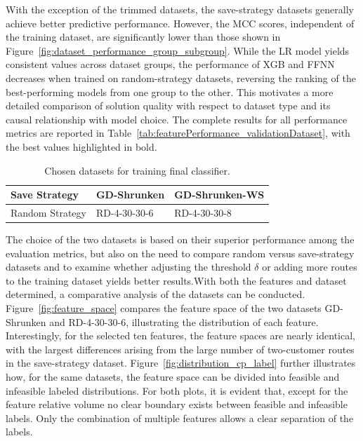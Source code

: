 With the exception of the trimmed datasets, the save-strategy datasets generally achieve better predictive performance.
However, the MCC scores, independent of the training dataset, are significantly lower than those shown in
Figure~\ref{fig:dataset_performance_group_subgroup}. While the LR model yields consistent values across dataset groups,
the performance of XGB and FFNN decreases when trained on random-strategy datasets, reversing the ranking of the best-performing
models from one group to the other. This motivates a more detailed comparison of solution quality with respect to dataset type and
its causal relationship with model choice. The complete results for all performance metrics are reported in Table~\ref{tab:featurePerformance_validationDataset},
with the best values highlighted in bold.
\begin{table}[ht]
    \centering
    \setlength{\tabcolsep}{0.75em}
    \def\arraystretch{1.25}
    \begin{tabular}{l|ll}
        Save Strategy   & GD-Shrunken  & GD-Shrunken-WS \\\hline
        Random Strategy & RD-4-30-30-6 & RD-4-30-30-8   \\
    \end{tabular}
    \caption{Chosen datasets for training final classifier.}
    \label{tab:chosen_datasets}
\end{table}
The choice of the two datasets is based on their superior performance among the evaluation metrics,
but also on the need to compare random versus save-strategy datasets and to examine whether adjusting the threshold $\delta$ or adding
more routes to the training dataset yields better results.With both the features and dataset determined, a comparative analysis of the
datasets can be conducted. Figure~\ref{fig:feature_space} compares the feature space of the two datasets GD-Shrunken and RD-4-30-30-6,
illustrating the distribution of each feature. Interestingly, for the selected ten features, the feature spaces are nearly identical,
with the largest differences arising from the large number of two-customer routes in the save-strategy dataset.
Figure~\ref{fig:distribution_cp_label} further illustrates how, for the same datasets, the feature space can be divided into
feasible and infeasible labeled distributions. For both plots, it is evident that, except for the feature relative volume
no clear boundary exists between feasible and infeasible labels. Only the combination of multiple features allows a clear
separation of the labels.

